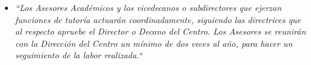 \begin{itemize}
   \item \textit{``Los Asesores Académicos y los vicedecanos o
   subdirectores que ejerzan funciones de tutoría actuarán coordinadamente,
   siguiendo las directrices que al respecto apruebe el Director o Decano del
   Centro. Los Asesores se reunirán con la Dirección del Centro un mínimo de dos
   veces al año, para hacer un seguimiento de la labor realizada.``}

\end{itemize}